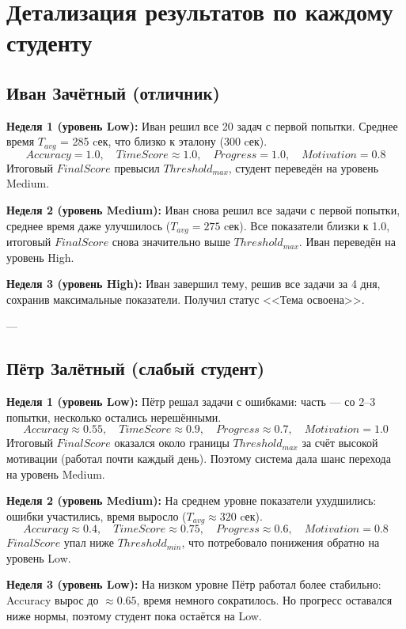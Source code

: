 \documentclass[12pt,a4paper]{article}
\begin{document}
\section{Детализация результатов по каждому студенту}

\subsection{Иван Зачётный (отличник)}
\textbf{Неделя 1 (уровень Low):}  
Иван решил все 20 задач с первой попытки. Среднее время $T_{avg}$ = 285 cек, что близко к эталону (300 cек).  
\[
Accuracy = 1.0, \quad TimeScore \approx 1.0, \quad Progress = 1.0, \quad Motivation = 0.8
\]
Итоговый $FinalScore$ превысил $Threshold_{max}$, студент переведён на уровень Medium.  

\textbf{Неделя 2 (уровень Medium):}  
Иван снова решил все задачи с первой попытки, среднее время даже улучшилось ($T_{avg}=275$ cек).  
Все показатели близки к 1.0, итоговый $FinalScore$ снова значительно выше $Threshold_{max}$. Иван переведён на уровень High.  

\textbf{Неделя 3 (уровень High):}  
Иван завершил тему, решив все задачи за 4 дня, сохранив максимальные показатели. Получил статус <<Тема освоена>>.  

---

\subsection{Пётр Залётный (слабый студент)}
\textbf{Неделя 1 (уровень Low):}  
Пётр решал задачи с ошибками: часть — со 2–3 попытки, несколько остались нерешёнными.  
\[
Accuracy \approx 0.55, \quad TimeScore \approx 0.9, \quad Progress \approx 0.7, \quad Motivation = 1.0
\]
Итоговый $FinalScore$ оказался около границы $Threshold_{max}$ за счёт высокой мотивации (работал почти каждый день). Поэтому система дала шанс перехода на уровень Medium.  

\textbf{Неделя 2 (уровень Medium):}  
На среднем уровне показатели ухудшились: ошибки участились, время выросло ($T_{avg} \approx 320$ cек).  
\[
Accuracy \approx 0.4, \quad TimeScore \approx 0.75, \quad Progress \approx 0.6, \quad Motivation = 0.8
\]
$FinalScore$ упал ниже $Threshold_{min}$, что потребовало понижения обратно на уровень Low.  

\textbf{Неделя 3 (уровень Low):}  
На низком уровне Пётр работал более стабильно: Accuracy вырос до $\approx 0.65$, время немного сократилось.  
Но прогресс оставался ниже нормы, поэтому студент пока остаётся на Low.  
\end{document}
